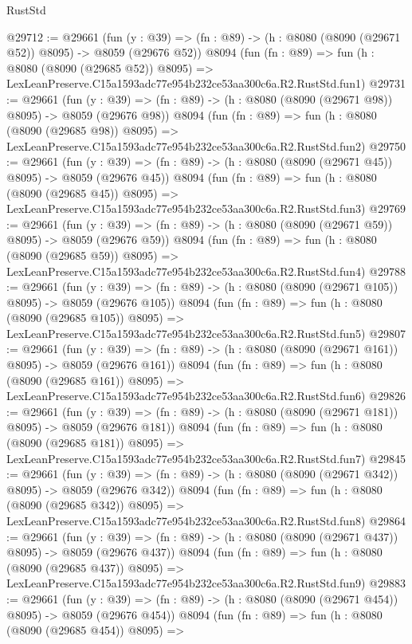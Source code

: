 \begin{lexlean}{RustStd}
\begin{coremodule}
@29712 := @29661
    (fun (y : @39) => (fn : @89) -> (h : @8080 (@8090 (@29671 @52)) @8095) -> @8059 (@29676 @52))
    @8094
    (fun (fn : @89) =>
    fun (h : @8080 (@8090 (@29685 @52)) @8095) =>
    LexLeanPreserve.C15a1593adc77e954b232ce53aa300c6a.R2.RustStd.fun1)
@29731 := @29661
    (fun (y : @39) => (fn : @89) -> (h : @8080 (@8090 (@29671 @98)) @8095) -> @8059 (@29676 @98))
    @8094
    (fun (fn : @89) =>
    fun (h : @8080 (@8090 (@29685 @98)) @8095) =>
    LexLeanPreserve.C15a1593adc77e954b232ce53aa300c6a.R2.RustStd.fun2)
@29750 := @29661
    (fun (y : @39) => (fn : @89) -> (h : @8080 (@8090 (@29671 @45)) @8095) -> @8059 (@29676 @45))
    @8094
    (fun (fn : @89) =>
    fun (h : @8080 (@8090 (@29685 @45)) @8095) =>
    LexLeanPreserve.C15a1593adc77e954b232ce53aa300c6a.R2.RustStd.fun3)
@29769 := @29661
    (fun (y : @39) => (fn : @89) -> (h : @8080 (@8090 (@29671 @59)) @8095) -> @8059 (@29676 @59))
    @8094
    (fun (fn : @89) =>
    fun (h : @8080 (@8090 (@29685 @59)) @8095) =>
    LexLeanPreserve.C15a1593adc77e954b232ce53aa300c6a.R2.RustStd.fun4)
@29788 := @29661
    (fun (y : @39) => (fn : @89) -> (h : @8080 (@8090 (@29671 @105)) @8095) -> @8059 (@29676 @105))
    @8094
    (fun (fn : @89) =>
    fun (h : @8080 (@8090 (@29685 @105)) @8095) =>
    LexLeanPreserve.C15a1593adc77e954b232ce53aa300c6a.R2.RustStd.fun5)
@29807 := @29661
    (fun (y : @39) => (fn : @89) -> (h : @8080 (@8090 (@29671 @161)) @8095) -> @8059 (@29676 @161))
    @8094
    (fun (fn : @89) =>
    fun (h : @8080 (@8090 (@29685 @161)) @8095) =>
    LexLeanPreserve.C15a1593adc77e954b232ce53aa300c6a.R2.RustStd.fun6)
@29826 := @29661
    (fun (y : @39) => (fn : @89) -> (h : @8080 (@8090 (@29671 @181)) @8095) -> @8059 (@29676 @181))
    @8094
    (fun (fn : @89) =>
    fun (h : @8080 (@8090 (@29685 @181)) @8095) =>
    LexLeanPreserve.C15a1593adc77e954b232ce53aa300c6a.R2.RustStd.fun7)
@29845 := @29661
    (fun (y : @39) => (fn : @89) -> (h : @8080 (@8090 (@29671 @342)) @8095) -> @8059 (@29676 @342))
    @8094
    (fun (fn : @89) =>
    fun (h : @8080 (@8090 (@29685 @342)) @8095) =>
    LexLeanPreserve.C15a1593adc77e954b232ce53aa300c6a.R2.RustStd.fun8)
@29864 := @29661
    (fun (y : @39) => (fn : @89) -> (h : @8080 (@8090 (@29671 @437)) @8095) -> @8059 (@29676 @437))
    @8094
    (fun (fn : @89) =>
    fun (h : @8080 (@8090 (@29685 @437)) @8095) =>
    LexLeanPreserve.C15a1593adc77e954b232ce53aa300c6a.R2.RustStd.fun9)
@29883 := @29661
    (fun (y : @39) => (fn : @89) -> (h : @8080 (@8090 (@29671 @454)) @8095) -> @8059 (@29676 @454))
    @8094
    (fun (fn : @89) =>
    fun (h : @8080 (@8090 (@29685 @454)) @8095) =>

\end{coremodule}
\end{lexlean}
